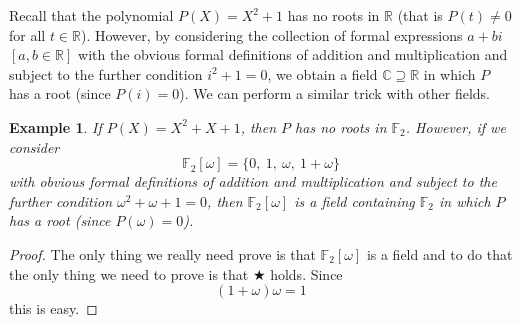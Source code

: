 \documentclass[12pt,a4paper]{article}
\theoremstyle{plain}
\newtheorem{example}[theorem]{Example}
\theoremstyle{definition}
\begin{document}
Recall that the polynomial $P(X)=X^{2}+1$ has no roots
in ${\mathbb R}$ (that is $P(t)\neq 0$ for all $t\in{\mathbb R}$).
However, by considering the collection
of formal expressions $a+bi$ $[a,b\in{\mathbb R}]$
with the
obvious formal definitions of addition and multiplication
and subject to the further
condition $i^{2}+1=0$, we obtain a field
${\mathbb C}\supseteq{\mathbb R}$ in which $P$ has a root
(since $P(i)=0$).
We can perform a similar trick with other fields.
\begin{example} If $P(X)=X^{2}+X+1$, then $P$ has
no roots in ${\mathbb F}_{2}$. However, if we consider
\[{\mathbb F}_{2}[\omega]=
\{0,\ 1,\ \omega,\ 1+\omega\}\]
with
obvious formal definitions of addition and multiplication
and subject to the further
condition $\omega^{2}+\omega+1=0$, then
${\mathbb F}_{2}[\omega]$ is a field containing ${\mathbb F}_{2}$
in which $P$ has a root (since $P(\omega)=0$).
\end{example}
\begin{proof}  The only thing we really
need prove is that
${\mathbb F}_{2}[\omega]$ is a field and to
do that the only thing we need to prove is that
$\bigstar$ holds. Since
\[(1+\omega)\omega=1\]
this is easy.
\end{proof}
\end{document}
